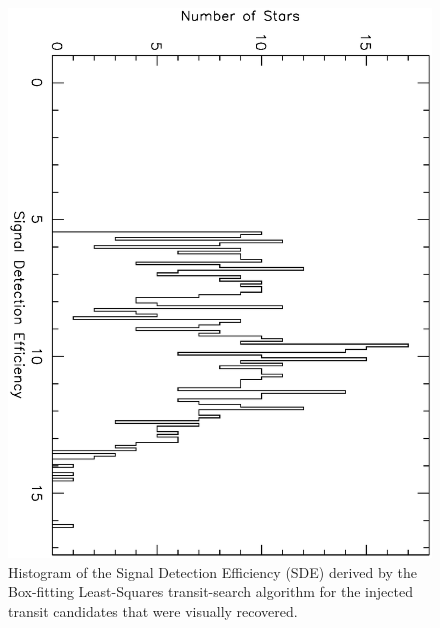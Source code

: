 \begin{figure}
\begin{center}
\centering
\includegraphics[width=.75\textwidth, angle=90]{7_visual_f}
\caption[Histogram of SDEs for visually recovered transit candidates]{%
Histogram of the Signal Detection Efficiency (SDE) derived by the Box-fitting Least-Squares transit-search algorithm for the injected transit candidates that were visually recovered.%
}
\label{cha:human:sec:model:fig:vishistsderec}
\end{center}
\end{figure}

